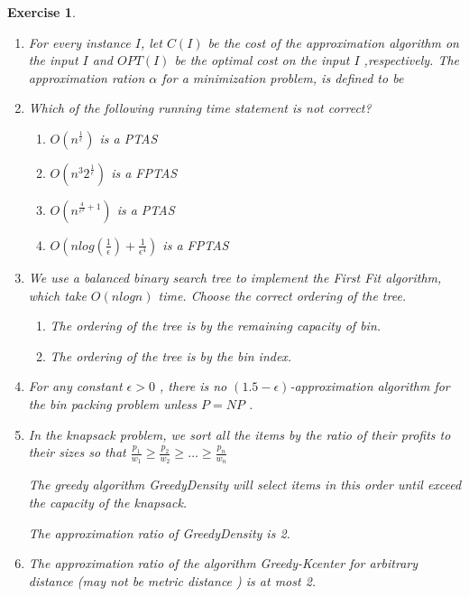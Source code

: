 \documentclass{article}
\newtheorem*{Exercise}{Exercise}
\begin{document}
\begin{Exercise}
    \begin{enumerate}
        \item For every instance $I$, let $C(I)$ be the cost of the approximation algorithm on the input $I$ and $OPT(I)$ be the optimal cost on the input $I$ ,respectively. The approximation ration $\alpha$ for a minimization problem, is defined to be
        \item Which of the following running time statement is not correct?
        \begin{enumerate}
            \item [A] $O(n^{\frac{1}{\epsilon}})$ is a PTAS
            \item [B] $O(n^{3} 2^{\frac{1}{\epsilon}})$ is a FPTAS
            \item [C] $O(n^{\frac{4}{\epsilon^2}+1})$ is a PTAS
            \item [D] $O(nlog(\frac{1}{\epsilon})+\frac{1}{\epsilon^4})$ is a FPTAS
        \end{enumerate}
        \item We use a balanced binary search tree to implement the First Fit algorithm, which take $O(n logn)$ time. Choose the correct ordering of the tree.
        \begin{enumerate}
            \item [A] The ordering of the tree is by the remaining capacity of bin.
            \item [B] The ordering of the tree is by the bin index.
        \end{enumerate}
        \item For any constant $\epsilon > 0$ , there is no $(1.5 - \epsilon)$-approximation algorithm for the bin packing problem unless $P = NP$ .
        \item In the knapsack problem, we sort all the items by the ratio of their profits to their sizes so that $\frac{p_1}{w_1} \ge \frac{p_2}{w_2} \ge \dots \ge \frac{p_n}{w_n}$\par
        The greedy algorithm GreedyDensity will select items in this order until exceed the capacity of the knapsack. \par
        The approximation ratio of GreedyDensity is 2.
        \item The approximation ratio of the algorithm Greedy-Kcenter for arbitrary distance (may not be metric distance ) is at most 2.
    \end{enumerate}
\end{Exercise}
\end{document}
